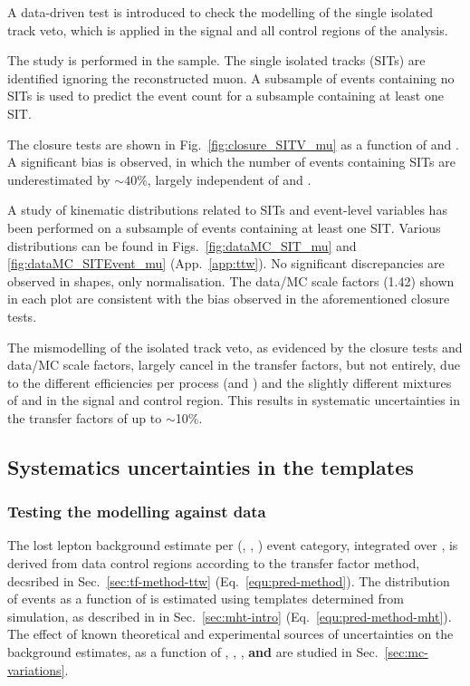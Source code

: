 A data-driven test is introduced to check the modelling of the single
isolated track veto, which is applied in the signal and all control
regions of the analysis.

The study is performed in the \mj sample. The single isolated tracks
(SITs) are identified ignoring the reconstructed muon. A subsample of
events containing no SITs is used to predict the event count for a
subsample containing at least one SIT. 

The closure tests are shown in Fig.~\ref{fig:closure_SITV_mu} as a
function of \scalht and \njet. A significant bias is observed, in
which the number of events containing SITs are underestimated by $\sim
40\%$, largely independent of \scalht and \njet. 

A study of kinematic distributions related to SITs and event-level
variables has been performed on a subsample of \mj events containing
at least one SIT. Various distributions can be found in
Figs.~\ref{fig:dataMC_SIT_mu} and \ref{fig:dataMC_SITEvent_mu}
(App.~\ref{app:ttw}). No significant discrepancies are observed in
shapes, only normalisation. The data/MC scale factors (1.42) shown in
each plot are consistent with the bias observed in the aforementioned
closure tests.

The mismodelling of the isolated track veto, as evidenced by the
closure tests and data/MC scale factors, largely cancel in the
transfer factors, but not entirely, due to the different efficiencies
per process (\eg \wj and \ttbar) and the slightly different mixtures
of \wj and \ttbar in the signal and \mj control region. This results
in systematic uncertainties in the transfer factors of up to
$\sim$10\%. 

\subsection{Systematics uncertainties in the \texorpdfstring{\HTmiss}{MHT} templates}
\label{sec:mht}

\subsubsection{Testing the \texorpdfstring{\HTmiss}{MHT} modelling against data}

The lost lepton background estimate per (\njet, \scalht, \nb) event
category, integrated over \mht, is derived from data control regions
according to the transfer factor method, decsribed in
Sec.~\ref{sec:tf-method-ttw} (\eg Eq.~\ref{equ:pred-method}). The
distribution of events as a function of \HTmiss is estimated using
\mht templates determined from simulation, as described in in
Sec.~\ref{sec:mht-intro} (\eg Eq.~\ref{equ:pred-method-mht}).  The
effect of known theoretical and experimental sources of uncertainties
on the background estimates, as a function of \njet, \scalht, \nb,
{\bf and} \HTmiss are studied in
Sec.~\ref{sec:mc-variations}. 

